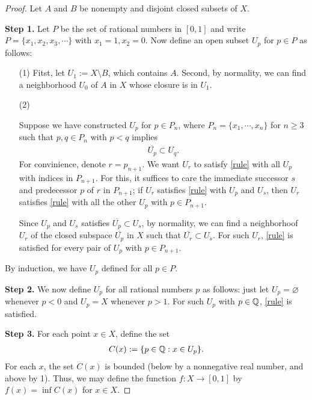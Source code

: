 \begin{proof}
    Let $A$ and $B$ be nonempty and disjoint closed subsets of $X$.

    \textbf{Step 1.}
    Let $P$ be the set of rational numbers in $[0, 1]$ and write $P=\{x_1, x_2, x_3, \cdots\}$ with $x_1=1, x_2=0$.
    Now define an open subset $U_p$ for $p\in P$ as follows:
    \begin{enumerate}
        \item[(1)]
        {
            Fitst, let $U_1:=X\setminus B$, which contains $A$.
            Second, by normality, we can find a neighborhood $U_0$ of $A$ in $X$ whose closure is in $U_1$.
        }
        \item[(2)]
        {
            Suppose we have constructed $U_p$ for $p\in P_n$, where $P_n=\{x_1, \cdots, x_n\} $ for $n\geq 3$ such that $p, q\in P_n$ with $p<q$ implies
            \begin{align}\label{rule}
                \overline{U_p}\subset U_q.
            \end{align}
            For convinience, denote $r=p_{n+1}$.
            We want $U_r$ to satisfy \cref{rule} with all $U_p$ with indices in $P_{n+1}$.
            For this, it suffices to care the immediate successor $s$ and predecessor $p$ of $r$ in $P_{n+1}$; if $U_r$ satisfies \cref{rule} with $U_p$ and $U_s$, then $U_r$ satisfies \cref{rule} with all the other $U_p$ with $p\in P_{n+1}$.

            Since $U_p$ and $U_s$ satisfies $\overline{U_p}\subset U_s$, by normality, we can find a neighborhoof $U_r$ of the closed subspace $\overline{U_p}$ in $X$ such that $\overline{U_r}\subset U_s$.
            For such $U_r$, \cref{rule} is satisfied for every pair of $U_p$ with $p\in P_{n+1}$.
        }
    \end{enumerate}
    By induction, we have $U_p$ defined for all $p\in P$.

    \textbf{Step 2.}
    We now define $U_p$ for all rational numbers $p$ as follows: just let $U_p=\varnothing$ whenever $p<0$ and $U_p=X$ whenever $p>1$.
    For such $U_p$ with $p\in{\mathbb{Q}}$, \cref{rule} is satisfied.
    
    \textbf{Step 3.}
    For each point $x\in X$, define the set
    \begin{align*}
        C(x):=\{p\in{\mathbb{Q}}:x\in U_p\}.
    \end{align*}
    For each $x$, the set $C(x)$ is bounded (below by a nonnegative real number, and above by 1).
    Thus, we may define the function $f: X\rightarrow[0, 1]$ by $f(x)=\inf C(x)$ for $x\in X$.


\end{proof}
